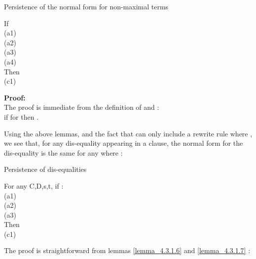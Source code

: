 \begin{lemma}{Persistence of the normal form for non-maximal terms}
\label{lemma_4.3.1.7}

\noindent
If\\
(a1) \\
(a2) \\
(a3) \\
(a4) \\
Then\\
(c1) 

\noindent
\textbf{Proof:}\\
The proof is immediate from the definition of  and :\\
if  for  then .
\end{lemma}

Using the above lemmas, and the fact that  can only include a rewrite rule  
where , we see that, for any dis-equality appearing in a clause, 
the normal form for the dis-equality is the same for any  where :
\begin{lemma}{Persistence of dis-equalities}
\label{lemma_4.3.1.8}

\noindent
For any C,D,s,t, if :\\
(a1) \\
(a2) \\
(a3) \\
Then\\
(c1) 

\noindent
The proof is straightforward from lemmas \ref{lemma_4.3.1.6} and \ref{lemma_4.3.1.7} :\\
\end{lemma}

